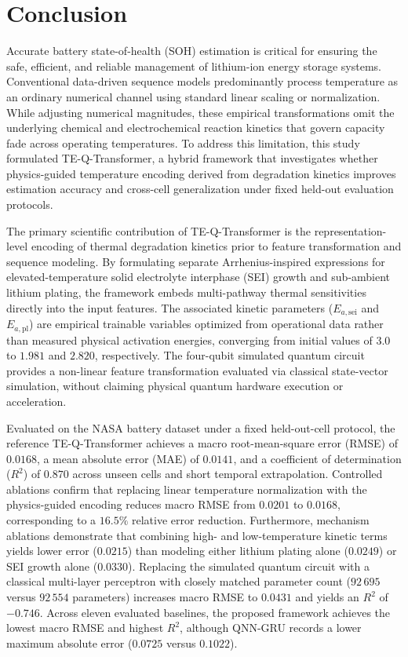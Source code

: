\documentclass[a4paper,fleqn]{cas-sc}
\begin{document}
\section{Conclusion}\label{sec:conclusion}
Accurate battery state-of-health (SOH) estimation is critical for ensuring the safe, efficient, and reliable management of lithium-ion energy storage systems. Conventional data-driven sequence models predominantly process temperature as an ordinary numerical channel using standard linear scaling or normalization. While adjusting numerical magnitudes, these empirical transformations omit the underlying chemical and electrochemical reaction kinetics that govern capacity fade across operating temperatures. To address this limitation, this study formulated TE-Q-Transformer, a hybrid framework that investigates whether physics-guided temperature encoding derived from degradation kinetics improves estimation accuracy and cross-cell generalization under fixed held-out evaluation protocols.

The primary scientific contribution of TE-Q-Transformer is the representation-level encoding of thermal degradation kinetics prior to feature transformation and sequence modeling. By formulating separate Arrhenius-inspired expressions for elevated-temperature solid electrolyte interphase (SEI) growth and sub-ambient lithium plating, the framework embeds multi-pathway thermal sensitivities directly into the input features. The associated kinetic parameters ($E_{a,\mathrm{sei}}$ and $E_{a,\mathrm{pl}}$) are empirical trainable variables optimized from operational data rather than measured physical activation energies, converging from initial values of $3.0$ to $1.981$ and $2.820$, respectively. The four-qubit simulated quantum circuit provides a non-linear feature transformation evaluated via classical state-vector simulation, without claiming physical quantum hardware execution or acceleration.

Evaluated on the NASA battery dataset under a fixed held-out-cell protocol, the reference TE-Q-Transformer achieves a macro root-mean-square error (RMSE) of $0.0168$, a mean absolute error (MAE) of $0.0141$, and a coefficient of determination ($R^2$) of $0.870$ across unseen cells and short temporal extrapolation. Controlled ablations confirm that replacing linear temperature normalization with the physics-guided encoding reduces macro RMSE from $0.0201$ to $0.0168$, corresponding to a $16.5\%$ relative error reduction. Furthermore, mechanism ablations demonstrate that combining high- and low-temperature kinetic terms yields lower error ($0.0215$) than modeling either lithium plating alone ($0.0249$) or SEI growth alone ($0.0330$). Replacing the simulated quantum circuit with a classical multi-layer perceptron with closely matched parameter count ($92\,695$ versus $92\,554$ parameters) increases macro RMSE to $0.0431$ and yields an $R^2$ of $-0.746$. Across eleven evaluated baselines, the proposed framework achieves the lowest macro RMSE and highest $R^2$, although QNN-GRU records a lower maximum absolute error ($0.0725$ versus $0.1022$).
\end{document}
